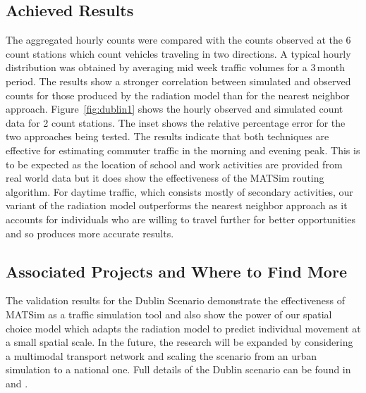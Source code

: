 \subsection{Achieved Results}
The aggregated hourly counts were compared with the counts observed at the 6 count stations which count vehicles traveling in two directions.  A typical hourly distribution was obtained by averaging mid week traffic volumes for a 3\,month period.  The results show a stronger correlation between simulated and observed counts for those produced by the radiation model than for the nearest neighbor approach. Figure~\ref{fig:dublin1} shows the hourly observed and simulated count data for 2 count stations.  The inset shows the relative percentage error for the two approaches being tested. The results indicate that both techniques are effective for estimating commuter traffic in the morning and evening peak. This is to be expected as the location of school and work activities are provided from real world data but it does show the effectiveness of the MATSim routing algorithm. For daytime traffic, which consists mostly of secondary activities, our variant of the radiation model outperforms the nearest neighbor approach as it accounts for individuals who are willing to travel further for better opportunities and so produces more accurate results.

\subsection{Associated Projects and Where to Find More}
The validation results for the Dublin Scenario demonstrate the effectiveness of MATSim as a traffic simulation tool and also show the power of our spatial choice model which adapts the radiation model to predict individual movement at a small spatial scale. In the future, the research will be expanded by considering a multimodal transport network and scaling the scenario from an urban simulation to a national one. Full details of the Dublin scenario can be found in \citet[][]{McArdleEtAl_IWUC_2012} and \citet[][]{McArdleEtAl_ACMTIS_2014}.


